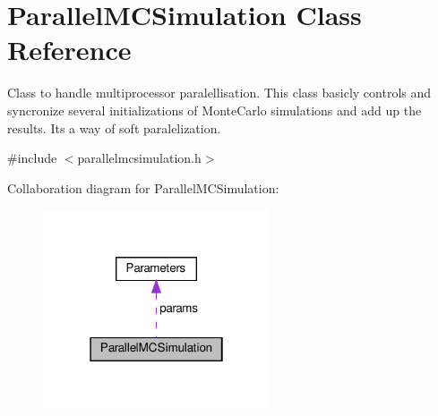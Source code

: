 \hypertarget{class_parallel_m_c_simulation}{}\section{Parallel\+M\+C\+Simulation Class Reference}
\label{class_parallel_m_c_simulation}


Class to handle multiprocessor paralellisation. This class basicly controls and syncronize several initializations of Monte\+Carlo simulations and add up the results. It\textquotesingle{}s a way of soft paralelization.  




{\ttfamily \#include $<$parallelmcsimulation.\+h$>$}



Collaboration diagram for Parallel\+M\+C\+Simulation\+:
\nopagebreak
\begin{figure}[H]
\begin{center}
\leavevmode
\includegraphics[width=190pt]{class_parallel_m_c_simulation__coll__graph}
\end{center}
\end{figure}
